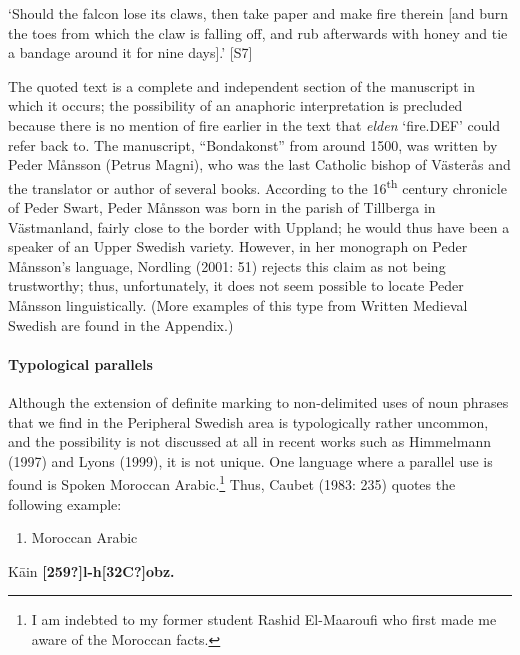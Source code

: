 ‘Should the falcon lose its claws, then take paper and make fire therein [and burn the toes from which the claw is falling off, and rub afterwards with honey and tie a bandage around it for nine days].’ [S7]
\z

The quoted text is a complete and independent section of the manuscript in which it occurs; the possibility of an anaphoric interpretation is precluded because there is no mention of fire earlier in the text that \textit{elden} ‘fire.DEF’ could refer back to. The manuscript, “Bondakonst” from around 1500, was written by Peder Månsson (Petrus Magni), who was the last Catholic bishop of Västerås and the translator or author of several books. According to the 16\textsuperscript{th} century chronicle of Peder Swart, Peder Månsson was born in the parish of Tillberga in Västmanland, fairly close to the border with Uppland; he would thus have been a speaker of an Upper Swedish variety. However, in her monograph on Peder Månsson’s language, Nordling (2001: 51) rejects this claim as not being trustworthy; thus, unfortunately, it does not seem possible to locate Peder Månsson linguistically. (More examples of this type from Written Medieval Swedish are found in the Appendix.) 

\paragraph[Typological parallels]{\rmfamily Typological parallels}
\label{bkm:Ref134937864}%
Although the extension of definite marking to non-delimited uses of noun phrases that we find in the Peripheral Swedish area is typologically rather uncommon, and the possibility is not discussed at all in recent works such as Himmelmann (1997) and Lyons (1999), it is not unique. One language where a parallel use is found is Spoken Moroccan Arabic.\footnote{ I am indebted to my former student Rashid El-Maaroufi who first made me aware of the Moroccan facts. } Thus, Caubet (1983: 235) quotes the following example:

\begin{enumerate} %
\item 
Moroccan Arabic

\end{enumerate} %
K\=ain  \textbf{[259?]l-h[32C?]obz.}


